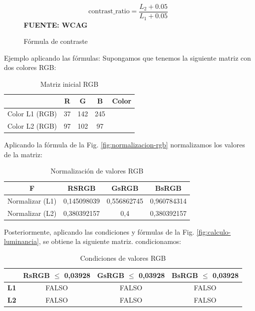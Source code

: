 \documentclass[lettersize,journal]{IEEEtran}
\begin{document}
\begin{itemize}
		\begin{figure}[ht]
			\centering
			\caption{Fórmula de contraste}
			\label{fig:formula-contraste}
			\[
			\text{contrast\_ratio} = \frac{L_2 + 0.05}{L_1 + 0.05}
			\]
			\vspace{0.2cm}
			\small\textbf{FUENTE: WCAG \cite{W3CContrast2012}}
		\end{figure}
		
		\noindent Ejemplo aplicando las fórmulas: Supongamos que tenemos la siguiente matriz con dos colores RGB:
		
		\begin{table}[ht]
			\centering
			\caption{Matriz inicial RGB}
			\label{tab:matriz-inicial-rgb}
			\begin{tabular}{|c|c|c|c|c|}
				\hline
				& \textbf{R} & \textbf{G} & \textbf{B} & \textbf{Color} \\
				\hline
				Color L1 (RGB) & 37 & 142 & 245 & \\
				\hline
				Color L2 (RGB) & 97 & 102 & 97 & \\
				\hline
			\end{tabular}
		\end{table}
		
		\noindent Aplicando la fórmula de la Fig. \ref{fig:normalizacion-rgb} normalizamos los valores de la matriz:
		
		\begin{table}[ht]
			\centering
			\caption{Normalización de valores RGB}
			\label{tab:normalizacion-rgb}
			\begin{tabular}{|c|c|c|c|}
				\hline
				\textbf{F} & \textbf{RSRGB} & \textbf{GsRGB} & \textbf{BsRGB} \\
				\hline
				Normalizar (L1) & 0,145098039 & 0,556862745 & 0,960784314 \\
				\hline
				Normalizar (L2) & 0,380392157 & 0,4 & 0,380392157 \\
				\hline
			\end{tabular}
		\end{table}
							
		\noindent Posteriormente, aplicando las condiciones y fórmulas de la Fig. \ref{fig:calculo-luminancia}, se obtiene la siguiente matriz. condicionamos:

			
		\begin{table}[H]
			\centering
			\caption{Condiciones de valores RGB}
			\label{tab:condiciones-rgb}
			\begin{tabular}{|c|c|c|c|}
				\hline
				& \textbf{RsRGB $\leq$ 0,03928} & \textbf{GsRGB $\leq$ 0,03928} & \textbf{BsRGB $\leq$ 0,03928} \\
				\hline
				\textbf{L1} & FALSO & FALSO & FALSO \\
				\hline
				\textbf{L2} & FALSO & FALSO & FALSO \\
				\hline
			\end{tabular}
		\end{table}
		

\end{itemize}
\end{document}
